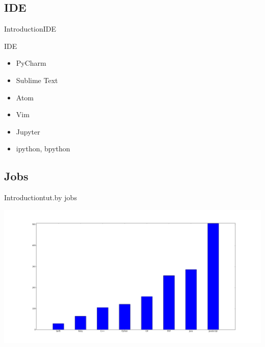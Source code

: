 \documentclass[10pt]{beamer}
\begin{document}
\subsection{IDE}


\begin{frame}[fragile]{Introduction}{IDE}
	
\begin{block}{IDE}
	\begin{itemize}
		
		\pause
		\item PyCharm
		\pause
			
		\item Sublime Text
		\pause
		
		\item Atom
		\pause	
		
		\item Vim
		\pause
		
		\item Jupyter
		\pause
		
		\item ipython, bpython
	\end{itemize}
\end{block}	
	
\end{frame}

\subsection{Jobs}

\begin{frame}{Introduction}{tut.by jobs}
\begin{center}
\includegraphics[width=1.1\textwidth]{pictures/minsk_job_tutby.png}
\end{center}
\end{frame}
\end{document}
